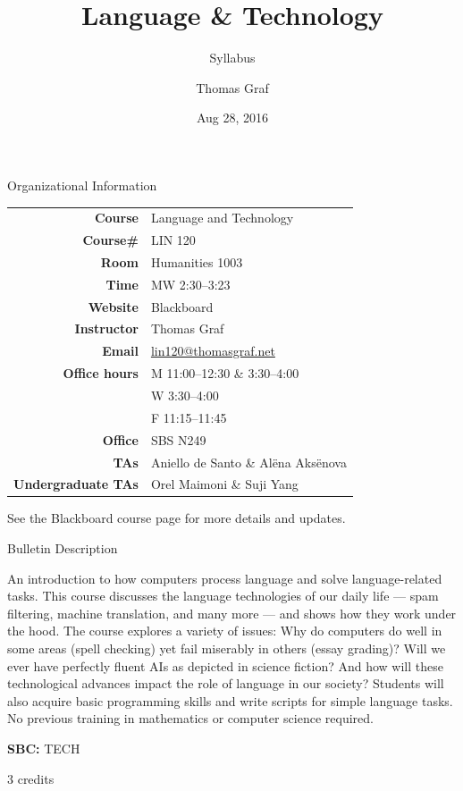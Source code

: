 \documentclass[professionalfonts, xcolor={usenames,svgnames,x11names,table}]{beamer}
\title{\texorpdfstring{Language \& Technology}{Language and Technology}}
\subtitle{Syllabus}
\author{Thomas Graf}
\institute{Stony Brook University\\\texttt{lin120@thomasgraf.net}}
\date{Aug 28, 2016}
\begin{document}
\unnumbered{
\begin{frame}
	\titlepage
\end{frame}
}

\begin{frame}{Organizational Information}
    \begin{center}
        \begin{tabular}{r@{\hspace{2em}}l}
            \textbf{Course}            & Language and Technology\\
            \textbf{Course\#}          & LIN 120\\
            \textbf{Room}              & Humanities 1003\\
            \textbf{Time}              & MW 2:30--3:23\\
            \textbf{Website}           & Blackboard\\[12pt]

            \textbf{Instructor}        & Thomas Graf\\
            \textbf{Email}             & \url{lin120@thomasgraf.net}\\
            \textbf{Office hours}      & M 11:00--12:30 \& 3:30--4:00\\
                                       & W 3:30--4:00\\
                                       & F 11:15--11:45\\
            \textbf{Office}            & SBS N249\\[12pt]

            \textbf{TAs}               & Aniello de Santo \& Al\"{e}na Aks\"{e}nova\\
            \textbf{Undergraduate TAs} & Orel Maimoni \& Suji Yang\\
        \end{tabular}
    \end{center}

    See the Blackboard course page for more details and updates.
\end{frame}


\begin{frame}{Bulletin Description}
    \small

    An introduction to how computers process language and solve language-related tasks. This course discusses the language technologies of our daily life --- spam filtering, machine translation, and many more --- and shows how they work under the hood. The course explores a variety of issues: Why do computers do well in some areas (spell checking) yet fail miserably in others (essay grading)? Will we ever have perfectly fluent AIs as depicted in science fiction? And how will these technological advances impact the role of language in our society? Students will also acquire basic programming skills and write scripts for simple language tasks. No previous training in mathematics or computer science required.    

    \textbf{SBC:} TECH

    3 credits
\end{frame}
\end{document}
